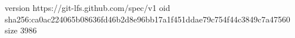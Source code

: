 version https://git-lfs.github.com/spec/v1
oid sha256:ca0ac224065b08636fd46b2d8e96bb17a1f451ddae79c754f44c3849c7a47560
size 3986
